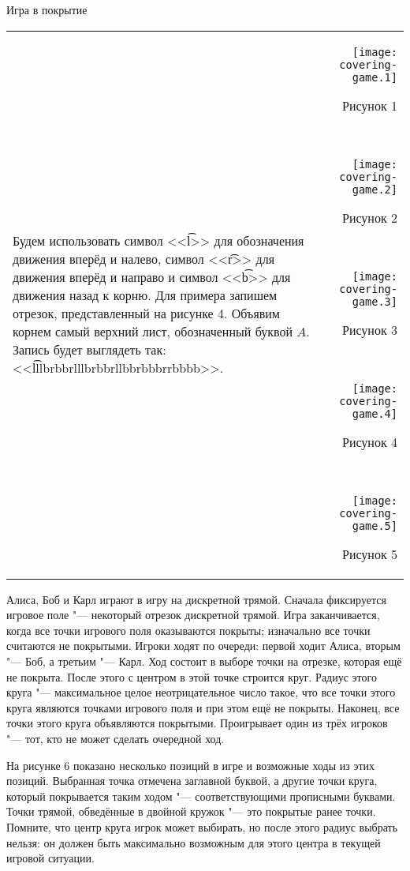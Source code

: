 \begin{problem}{Игра в покрытие}
\begin{tabular}{lr}
\begin{minipage}{0.70\thelinewidth}
Будем использовать символ <<\t{l}>> для обозначения движения вперёд и налево,
символ <<\t{r}>> для движения вперёд и направо и
символ <<\t{b}>> для движения назад к корню.
Для примера запишем отрезок, представленный на рисунке 4.
Объявим корнем самый верхний лист, обозначенный буквой $A$.
Запись будет выглядеть так: <<\t{lllbrbbrlllbrbbrllbbrbbbrrbbbb}>>.
\end{minipage}
&
\begin{minipage}{0.27\thelinewidth}
\begin{center}
\vskip -70pt

\texttt{[image: covering-game.1]}

Рисунок 1

~

\texttt{[image: covering-game.2]}

Рисунок 2

~

\texttt{[image: covering-game.3]}

Рисунок 3

~

\texttt{[image: covering-game.4]}

Рисунок 4

~

\texttt{[image: covering-game.5]}

Рисунок 5
\end{center}
\end{minipage}
\end{tabular}

\newpage

Алиса, Боб и Карл играют в игру на дискретной трямой.
Сначала фиксируется игровое поле "--- некоторый отрезок дискретной трямой.
Игра заканчивается, когда все точки игрового поля оказываются покрыты;
изначально все точки считаются не покрытыми.
Игроки ходят по очереди: первой ходит Алиса, вторым "--- Боб,
а третьим "--- Карл.
Ход состоит в выборе точки на отрезке, которая ещё не покрыта.
После этого с центром в этой точке строится круг.
Радиус этого круга "--- максимальное целое неотрицательное число такое, что
все точки этого круга являются точками игрового поля и при этом ещё не покрыты.
Наконец, все точки этого круга объявляются покрытыми.
Проигрывает один из трёх игроков "--- тот, кто не может сделать очередной ход.

На рисунке 6 показано несколько позиций в игре и возможные ходы
из этих позиций.
Выбранная точка отмечена заглавной буквой, а другие точки круга,
который покрывается таким ходом "--- соответствующими прописными буквами.
Точки трямой, обведённые в двойной кружок "--- это покрытые ранее точки.
Помните, что центр круга игрок может выбирать, но после этого радиус
выбрать нельзя: он должен быть максимально возможным для этого центра
в текущей игровой ситуации.


\end{problem}
